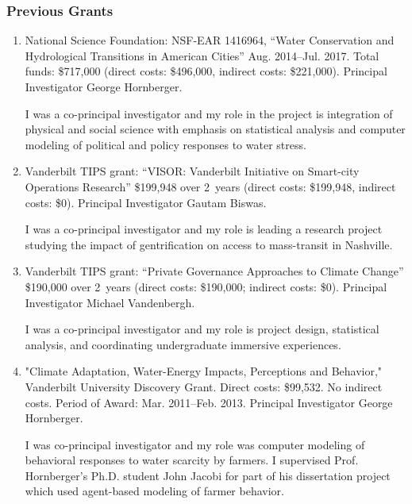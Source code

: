 \subsubsection{Previous Grants}
\begin{enumerate}
    \item National Science Foundation: NSF-EAR 1416964, ``Water Conservation and Hydrological Transitions in American Cities'' Aug. 2014--Jul. 2017. Total funds: \$717,000 (direct costs: \$496,000, indirect costs: \$221,000). Principal Investigator George Hornberger. 
    \begin{credit}
    I was a co-principal investigator and my role in the project is integration of physical and social science with emphasis on statistical analysis and computer modeling of political and policy responses to water stress.
    \end{credit}
    \item Vanderbilt TIPS grant: ``VISOR: Vanderbilt Initiative on Smart-city Operations Research'' \$199,948 over 2~years (direct costs: \$199,948, indirect costs: \$0). Principal Investigator Gautam Biswas. 
    \begin{credit}
	I was a co-principal investigator and my role is leading a research project studying the impact of gentrification on access to mass-transit in Nashville.
    \end{credit}
    \item Vanderbilt TIPS grant: ``Private Governance Approaches to Climate Change'' \$190,000 over 2~years (direct costs: \$190,000; indirect costs: \$0). Principal Investigator Michael Vandenbergh. 
    \begin{credit}
    I was a co-principal investigator and my role is project design, statistical analysis, and coordinating undergraduate immersive experiences.
    \end{credit}
	\item "Climate Adaptation, Water-Energy Impacts, Perceptions and Behavior," Vanderbilt University Discovery Grant. Direct costs: \$99,532. No indirect costs. Period of Award: Mar. 2011--Feb. 2013. Principal Investigator George Hornberger. 
	\begin{credit}
	I was co-principal investigator and my role was computer modeling of behavioral responses to water scarcity by farmers. I supervised Prof. Hornberger's Ph.D. student John Jacobi for part of his dissertation project which used agent-based modeling of farmer behavior.
	\end{credit}

\end{enumerate}

